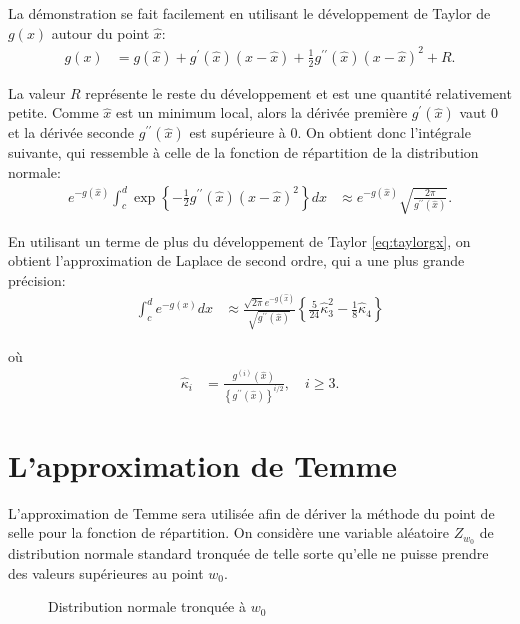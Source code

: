 La démonstration se fait facilement en utilisant le développement de
Taylor de $g(x)$ autour du point $\hat{x}$:
\begin{align}
  \label{eq:taylorgx}
  g(x) &= g(\hat{x}) + g^{\prime}(\hat{x})(x-\hat{x}) + \frac{1}{2}
  g^{\prime\prime}(\hat{x})(x-\hat{x})^2 + R.
\end{align}

La valeur $R$ représente le reste du développement et est une quantité
relativement petite. Comme $\hat{x}$ est un minimum local, alors la
dérivée première $g^{\prime}(\hat{x})$ vaut $0$ et la dérivée seconde
$g^{\prime\prime}(\hat{x})$ est supérieure à 0. On obtient donc
l'intégrale suivante, qui ressemble à celle de la fonction de
répartition de la distribution normale:
\begin{align}
  \label{eq:integraleapproxlaplace1}
  e^{-g(\hat{x})}\int_{c}^{d}
  \exp{\left\{-\frac{1}{2}g^{\prime\prime}(\hat{x})(x-\hat{x})^2
    \right\}}dx &\approx e^{-g(\hat{x})}
  \sqrt{\frac{2\pi}{g^{\prime\prime}(\hat{x})}}.
\end{align}

En utilisant un terme de plus du développement de Taylor
\eqref{eq:taylorgx}, on obtient l'approximation de Laplace de second
ordre, qui a une plus grande précision:
\begin{align}
  \label{eq:approxlaplace2}
  \int_{c}^{d} e^{-g(x)}dx &\approx
  \frac{\sqrt{2\pi}e^{-g(\hat{x})}}{\sqrt{g^{\prime\prime}(\hat{x})}}\left\{\frac{5}{24}\hat{\kappa}_3^2
    - \frac{1}{8} \hat{\kappa}_4 \right\}
\end{align}

où
\begin{align}
  \hat{\kappa}_i &=
  \frac{g^{(i)}(\hat{x})}{\left\{g^{\prime\prime}(\hat{x})\right\}^{i/2}}
  ,\quad i\geq 3 \label{eq:kappailaplace}.
\end{align}

\section{L'approximation de Temme}
\label{sec:lappr-de-temme}

L'approximation de Temme sera utilisée afin de dériver la méthode du
point de selle pour la fonction de répartition.  On considère une
variable aléatoire $Z_{w_0}$ de distribution normale standard tronquée
de telle sorte qu'elle ne puisse prendre des valeurs supérieures au
point $w_0$.
\begin{figure}[!ht]
  \centering 
  \caption{Distribution normale tronquée à $w_0$}
  \label{fig:normaletronque}
\end{figure}

